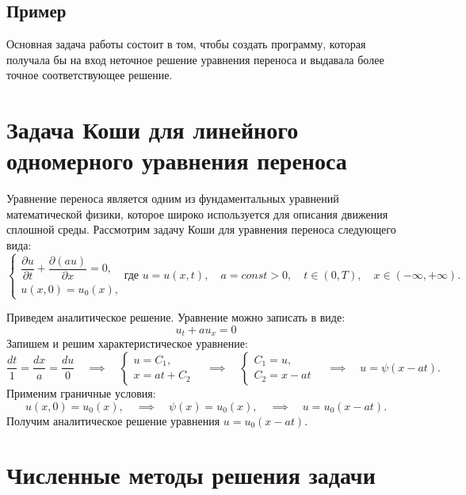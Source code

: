 \documentclass[12pt, a4paper]{article}
\begin{document}
\subsection{Пример}
Основная задача работы состоит в том, чтобы создать программу, которая получала бы на вход неточное решение уравнения переноса и выдавала более точное соответствующее решение.


\section{Задача Коши для линейного одномерного уравнения переноса}
Уравнение переноса является одним из фундаментальных уравнений математической физики, которое широко используется для описания движения сплошной среды. Рассмотрим задачу Коши для уравнения переноса следующего вида:
\begin{equation}
	\begin{cases}
		\dfrac{\partial u}{\partial t} + \dfrac{\partial (a u)}{\partial x} = 0, \\
		u(x, 0) = u_0(x),
	\end{cases} 
	\text{где } u = u(x, t), \quad a = const > 0, \quad t \in (0, T), \quad x \in (-\infty, +\infty) .
\end{equation}


Приведем аналитическое решение. Уравнение можно записать в виде:
\begin{equation*}
	u_t + a u_x = 0
\end{equation*}
Запишем и решим характеристическое уравнение:
\begin{equation*}
	\dfrac{dt}{1} = \dfrac{dx}{a} = \dfrac{du}{0} \quad \implies  \quad 
	\begin{cases}
		u = C_1,\\
		x = a t + C_2
	\end{cases} 
	\quad \implies \quad
	\begin{cases}
		C_1 = u,\\
		C_2 = x - at
	\end{cases}
	 \quad \implies \quad
	 u = \psi(x-a t).
\end{equation*}
Применим граничные условия:
\begin{equation*}
	u(x, 0) = u_0(x),
	\quad \implies \quad
	\psi(x) = u_0(x),
	 \quad \implies \quad
	 u = u_0(x-a t).
\end{equation*}
Получим аналитическое решение уравнения $u = u_0(x-at)$.

\section{Численные методы решения задачи}
\end{document}
